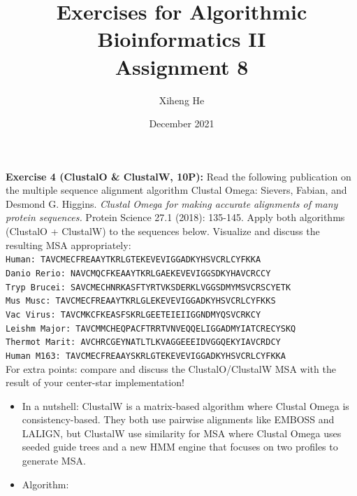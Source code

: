 \documentclass{article}
\title{Exercises for Algorithmic Bioinformatics II\\
Assignment 8}
\author{Xiheng He}
\date{December 2021}
\begin{document}
{\let\newpage\relax\maketitle}
\begin{flushleft}
\textbf{Exercise 4 (ClustalO \& ClustalW, 10P):}
\newline
Read the following publication on the multiple sequence alignment algorithm Clustal Omega:
\newline
Sievers, Fabian, and Desmond G. Higgins. \textit{Clustal Omega for making accurate alignments of many protein sequences.} Protein Science 27.1 (2018): 135-145.
\newline
Apply both algorithms (ClustalO + ClustalW) to the sequences below. Visualize and discuss the
resulting MSA appropriately:
\newline \\
\texttt{Human: TAVCMECFREAAYTKRLGTEKEVEVIGGADKYHSVCRLCYFKKA} \\
\texttt{Danio Rerio: NAVCMQCFKEAAYTKRLGAEKEVEVIGGSDKYHAVCRCCY} \\
\texttt{Tryp Brucei: SAVCMECHNRKASFTYRTVKSDERKLVGGSDMYMSVCRSCYETK} \\
\texttt{Mus Musc: TAVCMECFREAAYTKRLGLEKEVEVIGGADKYHSVCRLCYFKKS} \\
\texttt{Vac Virus: TAVCMKCFKEASFSKRLGEETEIEIIGGNDMYQSVCRKCY} \\
\texttt{Leishm Major: TAVCMMCHEQPACFTRRTVNVEQQELIGGADMYIATCRECYSKQ} \\
\texttt{Thermot Marit: AVCHRCGEYNATLTLKVAGGEEEIDVGGQEKYIAVCRDCY} \\
\texttt{Human M163: TAVCMECFREAAYSKRLGTEKEVEVIGGADKYHSVCRLCYFKKA}
\newline \\
For extra points: compare and discuss the ClustalO/ClustalW MSA with the result of your center-star implementation!
\begin{itemize}
    \item In a nutshell: 
    \newline
    ClustalW is a matrix-based algorithm where Clustal Omega is consistency-based.
    They both use pairwise alignments like EMBOSS and LALIGN, but ClustalW use similarity for MSA where Clustal Omega uses
    seeded guide trees and a new HMM engine that focuses on two profiles to generate MSA.
    \item Algorithm: \begin{itemize}

\end{itemize}
\end{itemize}
\end{flushleft}
\end{document}
